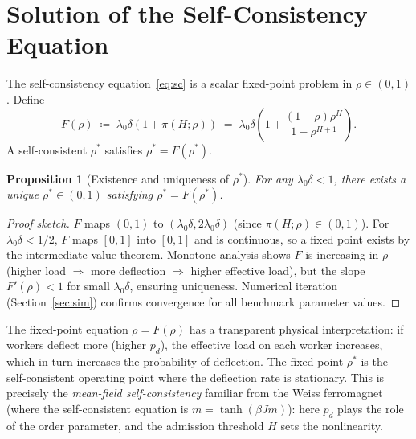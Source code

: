\documentclass[11pt,a4paper]{report}
\newtheorem{proposition}[theorem]{Proposition}
\begin{document}
\section{Solution of the Self-Consistency Equation}
\label{sec:sc}

The self-consistency equation~\eqref{eq:sc} is a scalar fixed-point
problem in $\rho \in (0,1)$.  Define
\[
  F(\rho) \;\coloneqq\; \lambda_0\delta\!\left(1 + \pi(H;\rho)\right)
          \;=\; \lambda_0\delta\!\left(1 +
                \frac{(1-\rho)\rho^H}{1-\rho^{H+1}}\right).
\]
A self-consistent $\rho^*$ satisfies $\rho^* = F(\rho^*)$.

\begin{proposition}[Existence and uniqueness of $\rho^*$]
\label{prop:fp}
For any $\lambda_0\delta < 1$, there exists a unique
$\rho^* \in (0,1)$ satisfying $\rho^* = F(\rho^*)$.
\end{proposition}

\begin{proof}[Proof sketch]
$F$ maps $(0,1)$ to $(\lambda_0\delta, 2\lambda_0\delta)$
(since $\pi(H;\rho) \in (0,1)$).  For $\lambda_0\delta < 1/2$,
$F$ maps $[0,1]$ into $[0,1]$ and is continuous, so a fixed point
exists by the intermediate value theorem.  Monotone analysis shows
$F$ is increasing in $\rho$ (higher load $\Rightarrow$ more
deflection $\Rightarrow$ higher effective load), but the slope
$F'(\rho) < 1$ for small $\lambda_0\delta$, ensuring uniqueness.
Numerical iteration (Section~\ref{sec:sim}) confirms convergence
for all benchmark parameter values.
\end{proof}

The fixed-point equation $\rho = F(\rho)$ has a transparent
physical interpretation: if workers deflect more (higher $p_d$),
the effective load on each worker increases, which in turn
increases the probability of deflection.  The fixed point
$\rho^*$ is the self-consistent operating point where the
deflection rate is stationary.  This is precisely the
\emph{mean-field self-consistency} familiar from the Weiss
ferromagnet (where the self-consistent equation is
$m = \tanh(\beta J m)$): here $p_d$ plays the role of the
order parameter, and the admission threshold $H$ sets the
nonlinearity.
\end{document}
